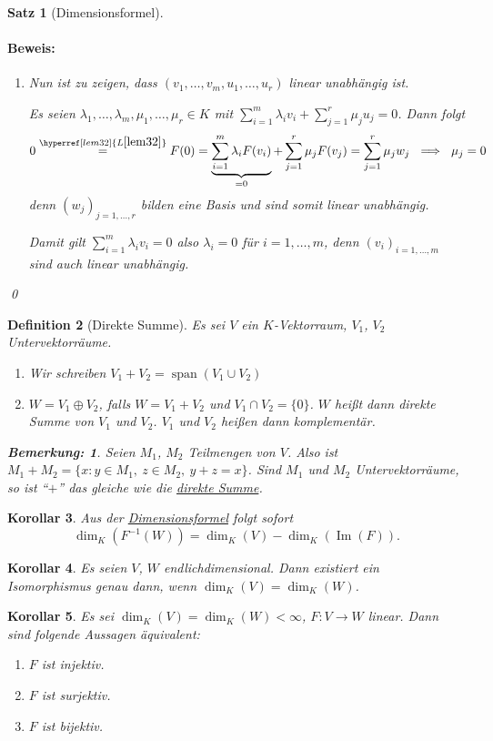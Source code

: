 \documentclass{report}
\newcommand{\IN}[1]{\index{#1|BH}}
\newcommand{\lb}{\lambda}
\DeclareMathOperator{\Span}{span}
\DeclareMathOperator{\Ima}{Im}
\theoremstyle{customrem}
\newtheorem*{bemerkung}{Bemerkung\textnormal:}
\theoremstyle{customdef}
\newtheorem{definition}{Definition}[chapter]
\newtheorem{korrolar}[definition]{Korollar}
\newtheorem{satz}[definition]{Satz}
\renewenvironment{proof}{\paragraph{Beweis: }}{\qed}
\begin{document}
\begin{satz}[Dimensionsformel]
\begin{proof}
\begin{enumerate}
				\item Nun ist zu zeigen, dass $(v_1, \ldots, v_m, u_1, \ldots, u_r)$ linear unabhängig ist.
				
				Es seien $\lb_1,\ldots, \lb_m, \mu_1, \ldots, \mu_r\in K$ mit $\sum_{i=1}^{m}\lb_i v_i + \sum_{j=1}^{r}\mu_j u_j=0$. Dann folgt $$0\stackrel{\hyperref[lem32]{L\ref*{lem32}}}{=} F(0) = \underbrace{\sum_{i=1}^{m}\lb_i F(v_i)}_{=0} + \sum_{j=1}^{r}\mu_jF(v_j) = \sum_{j=1}^{r}\mu_jw_j\ \implies \ \mu_j = 0$$ denn $(w_j)_{j=1,\ldots, r}$ bilden eine Basis und sind somit linear unabhängig.
				
				Damit gilt $\sum_{i=1}^{m}\lb_iv_i=0$ also $\lb_i=0$ für $i=1, \ldots, m$, denn $(v_i)_{i=1, \ldots, m}$ sind auch linear unabhängig.\\
			\end{enumerate}
		\end{proof}
	\end{satz}
	
	\begin{definition}[Direkte Summe]
		\IN{Direkte Summe}
		\label{def38}
		Es sei $V$ ein $K$-Vektorraum, $V_1$, $V_2$ Untervektorräume.
		\begin{enumerate}
			\item Wir schreiben $V_1+V_2=\Span(V_1\cup V_2)$
			\item $W=V_1\oplus V_2$, falls $W=V_1+V_2$ und $V_1\cap V_2 = \{0\}$. $W$ heißt dann \textsl{direkte Summe} von $V_1$ und $V_2$. $V_1$ und $V_2$ heißen dann komplementär.
		\end{enumerate}
		\begin{bemerkung}
			Seien $M_1$, $M_2$ Teilmengen von $V$. Also ist $M_1 + M_2 = \{x:y\in M_1,\ z\in M_2,\ y+z=x\}$. Sind $M_1$ und $M_2$ Untervektorräume, so ist "`$+$"' das gleiche wie die \hyperref[def38]{direkte Summe}.
		\end{bemerkung}
	\end{definition}
	\vspace{.1cm}
	\begin{korrolar}		
		Aus der \hyperref[satz37]{Dimensionsformel} folgt sofort $$\dim_K\left(F^{-1}(W)\right) = \dim_K(V)-\dim_K(\Ima(F)).$$
	\end{korrolar}
	
	\begin{korrolar}
		Es seien $V$, $W$ endlichdimensional. Dann existiert ein Isomorphismus genau dann, wenn $\dim_K(V)=\dim_K(W)$.
	\end{korrolar}
	\pagebreak[3]
	\begin{korrolar}
		Es sei $\dim_K(V)=\dim_K(W) < \infty$, $F:V\to W$ linear. Dann sind folgende Aussagen äquivalent:
		
		\begin{enumerate}[leftmargin = 7cm]
			\item[i)] $F$ ist injektiv.
			\item[ii)] $F$ ist surjektiv.
			\item[iii)] $F$ ist bijektiv.
		\end{enumerate}
	\end{korrolar}
	
\end{document}
